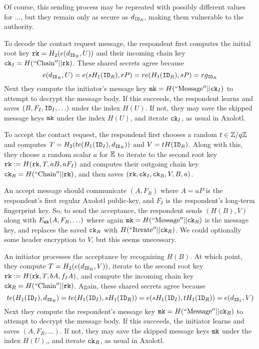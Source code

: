 \documentclass[twoside,letterpaper]{sig-alternate}
\def\mathperiod{.}
\def\mathperiod{}
\begin{document}
Of course, this sending process may be repreated with possibly different
values for $\ldots$, but they remain only as secure as $d_{\mathtt{ID}_R}$,
making them vulnerable to the authority.

\smallskip

To decode the contact request message, the respondent 
first computes the initial root key $\mathtt{rk} = H_2( e(d_{\mathtt{ID}_R}, U) )$
and their incoming chain key $\mathtt{ck}_I = H(\mathrm{``Chain''} || \mathtt{rk})$.
These shared secrets agree because 
$$ e(d_{\mathtt{ID}_R}, U) = e(s H_1(\mathtt{ID}_R), r P) = r e(H_1(\mathtt{ID}_R), s P) = r g_{\mathtt{ID}_R} $$
Next they compute the initiator's
 message key $\mathtt{mk} = H(\mathrm{``Message''}  || \mathtt{ck}_I)$ 
to attempt to decrypt the message body.
If this succeeds, the respondent learns and saves $(B,F_I,\mathtt{ID}_I,\ldots)$
 under the index $H(U)$.
If not, they may save the skipped message keys $\mathtt{mk}$ under
the index $H(U)$, and iterate $\mathtt{ck}_I$, as usual in Axolotl.

To accept the contact request,
the respondend first chooses a random $t \in \mathbb{Z}/q\mathbb{Z}$ and 
 computes $T = H_2( t e(H_1(\mathtt{ID}_I),d_{\mathtt{ID}_R}) )$ and $V = t H(\mathtt{ID}_R)$.
Along with this, they choose a random scalar $a$ for $\mathbb{E}$ to
iterate to the second root key $\mathtt{rk} := H(\mathtt{rk}, T, a B, a F_I)$ and
 computes their outgoing chain key $\mathtt{ck}_R = H(\mathrm{``Chain''} || \mathtt{rk})$,
and then saves $(\mathtt{rk},\mathtt{ck}_I,\mathtt{ck}_R,V,B,a)$. 

An accept message should communicate $(A,F_R)$ where 
 $A = a P$ is the respondent's first regular Axolotl public-key, and
 $F_I$ is the respondent's long-term fingerprint key.
So, to send the acceptance, the respondent
sends $(H(B),V)$ along with $E_{\mathtt{mk}}(A,F_R,\ldots)$ where again
 $\mathtt{mk} = H(\mathrm{``Message''}  || \mathtt{ck}_R)$ is the message key,
and replaces the saved $\mathtt{ck}_R$ with $H(\mathrm{``Iterate''} || \mathtt{ck}_R)$.
We could optionally some header encryption to $V$, but this seems unecessary.

\smallskip

An initiator processes the acceptance by recognizing $H(B)$.
At which point, they compute $T = H_2( e(d_{\mathtt{ID}_R}, V) )$,
iterate to the second root key $\mathtt{rk} := H(\mathtt{rk}, T, b A, f_I A )$, and 
compute the incoming chain key $\mathtt{ck}_R = H(\mathrm{``Chain''} || \mathtt{rk})$.
Again, these shared secrets agree because 
$$ t e(H_1(\ID_I), d_{\ID_R}) = t e(H_1(\ID_I), s H_1(\ID_R))
  = e(s H_1(\ID_I), t H_1(\ID_R)) = e(d_{\ID_I}, V) \mathperiod $$
Next they compute the respondent's
 message key $\mathtt{mk} = H(\mathrm{``Message''}  || \mathtt{ck}_R)$ 
to attempt to decrypt the message body.
If this succeeds, the initiator learns and saves $(A,F_R,\ldots)$.
If not, they may save the skipped message keys $\mathtt{mk}$ under the index $H(U)$,,
and iterate $\mathtt{ck}_R$, as usual in Axolotl.
\end{document}

